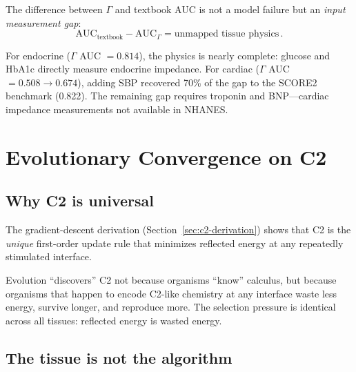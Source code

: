 \documentclass[aps,pre,twocolumn,superscriptaddress,floatfix]{revtex4-2}
\begin{document}
The difference between $\Gamma$ and textbook AUC is
not a model failure but an \emph{input measurement gap}:
\begin{equation}
  \text{AUC}_{\text{textbook}} - \text{AUC}_{\Gamma}
  = \text{unmapped tissue physics}\,.
  \label{eq:gap}
\end{equation}

For endocrine ($\Gamma$ AUC $= 0.814$), the physics
is nearly complete: glucose and HbA1c directly measure
endocrine impedance.
For cardiac ($\Gamma$ AUC $= 0.508 \to 0.674$),
adding SBP recovered 70\% of the gap to the SCORE2
benchmark (0.822).
The remaining gap requires troponin and BNP---cardiac
impedance measurements not available in NHANES.


\section{Evolutionary Convergence on C2}
\label{sec:evolution}

\subsection{Why C2 is universal}

The gradient-descent derivation (Section~\ref{sec:c2-derivation})
shows that C2 is the \emph{unique} first-order
update rule that minimizes reflected energy at any
repeatedly stimulated interface.

Evolution ``discovers'' C2 not because organisms
``know'' calculus, but because organisms that happen
to encode C2-like chemistry at any interface
waste less energy, survive longer, and reproduce more.
The selection pressure is identical across all tissues:
reflected energy is wasted energy.

\subsection{The tissue is not the algorithm}
\end{document}
